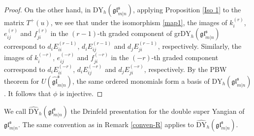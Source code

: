 \documentclass[a4paper,12pt]{article}
\numberwithin{equation}{section}
\begin{document}
\begin{proof}
On the other hand, in $\mathrm{DY}_{h}(\mathfrak{gl}^{\mathfrak{s}}_{m|n})$, applying Proposition \ref{Iso 1} to the matrix $T^{+}(u)$, we see that under the isomorphism \eqref{map1}, the images of $k_{i}^{(r)}$, $e_{ij}^{(r)}$ and $f_{ji}^{(r)}$ in the $(r-1)$-th graded component of gr$\mathrm{DY}_{h}(\mathfrak{gl}^{\mathfrak{s}}_{m|n})$  correspond to $d_{i}E_{ii}^{(r-1)}$, $d_{i}E_{ij}^{(r-1)}$ and $d_{j}E_{ji}^{(r-1)}$, respectively. Similarly, the images of $k_{i}^{(-r)}$, $e_{ij}^{(-r)}$ and $f_{ji}^{(-r)}$ in the $(-r)$-th graded component correspond to $d_{i}E_{ii}^{(-r)}$, $d_{i}E_{ij}^{(-r)}$ and $d_{j}E_{ji}^{(-r)}$, respectively. By the PBW theorem for $U(\widehat{\mathfrak{gl}}^{\mathfrak{s}}_{m|n})$, the same ordered monomials form a basis of $\mathrm{DY}_{h}(\mathfrak{gl}^{\mathfrak{s}}_{m|n})$. It follows that $\phi$ is injective.
\end{proof}

We call $\widehat{\mathrm{DY}}_{h}(\mathfrak{gl}_{m|n}^{\mathfrak{s}})$ the Drinfeld presentation for the double super Yangian of $\mathfrak{gl}_{m|n}^{\mathfrak{s}}$. The same convention as in Remark \ref{conven-R} applies to $\widehat{\mathrm{DY}}_{h}(\mathfrak{gl}_{m|n}^{\mathfrak{s}})$. 
\end{document}
